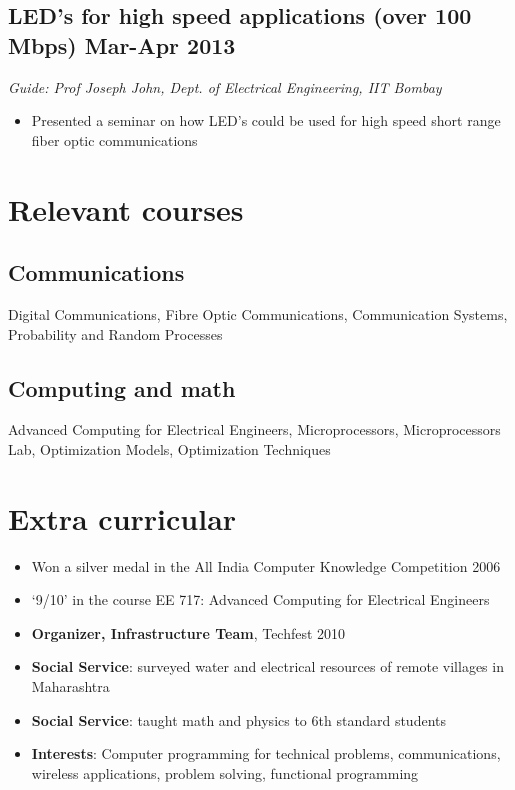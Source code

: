\documentclass[12pt]{article}
\begin{document}
\subsection*{LED's for high speed applications (over 100 Mbps) \hfill  Mar-Apr 2013}
\emph{Guide: Prof Joseph John, Dept. of Electrical Engineering, IIT Bombay}  
\begin{itemize}  
\item Presented a seminar on how LED's could be used for high speed short range fiber optic communications\end{itemize}

\section*{Relevant courses}

\subsection*{Communications}
Digital Communications, Fibre Optic Communications, Communication Systems, Probability and Random Processes

\subsection*{Computing and math}
Advanced Computing for Electrical Engineers, Microprocessors, Microprocessors Lab, Optimization Models, Optimization Techniques

\section*{Extra curricular}
\begin{itemize}
\item Won a silver medal in the All India Computer Knowledge Competition 2006 
\item `9/10' in the course EE 717: Advanced Computing for Electrical Engineers 
\item \textbf{Organizer, Infrastructure Team}, Techfest 2010 
\item \textbf{Social Service}: surveyed water and electrical resources of remote villages in Maharashtra 
\item \textbf{Social Service}: taught math and physics to 6th standard students 
\item \textbf{Interests}:  Computer programming for technical problems, communications, wireless applications, problem solving, functional programming 
\end{itemize}
\end{document}
